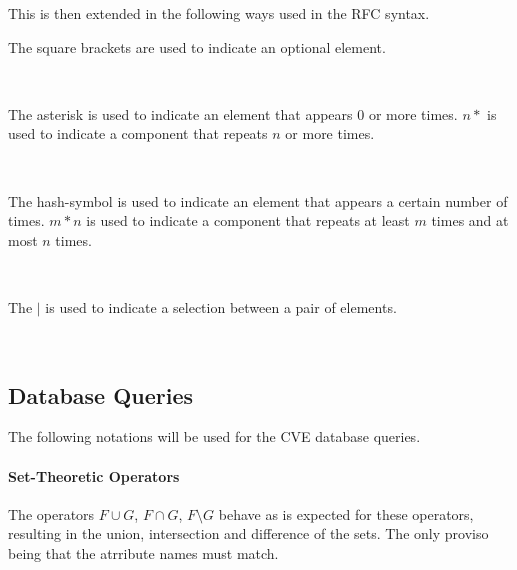 \begin{bnf*}
\end{bnf*}
This is then extended in the following ways used in the RFC syntax.

The square brackets are used to indicate an optional element.
\begin{bnf*}
\\
\end{bnf*}

The asterisk is used to indicate an element that appears 0 or more times. $n*$
is used to indicate a component that repeats $n$ or more times.

\begin{bnf*}
\\
\end{bnf*}

The hash-symbol is used to indicate an element that appears a certain number of
times. $m*n$ is used to indicate a component that repeats at least $m$ times and
at most $n$ times.

\begin{bnf*}
\\
\end{bnf*}

The $|$ is used to indicate a selection between a pair of elements.
\begin{bnf*}
\\
\end{bnf*}

\subsection{Database Queries}
The following notations will be used for the CVE database queries.

\paragraph{Set-Theoretic Operators}
The operators $F\cup G$, $F \cap G$, $F\setminus G$ behave as is expected for
these operators, resulting in the union, intersection and difference of the
sets.  The only proviso being that the atrribute names must match.

